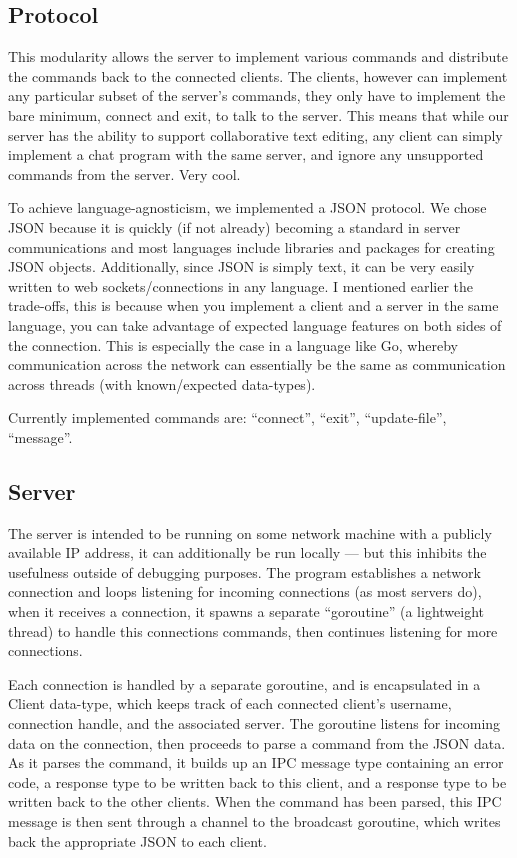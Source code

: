 \documentclass[10pt, letterpaper]{article}
\begin{document}
\subsection*{Protocol}

This modularity allows the server to implement various commands and 
distribute the commands back to the connected clients. The clients, however 
can implement any particular subset of the server's commands, they only have 
to implement the bare minimum, connect and exit, to talk to the server. This 
means that while our server has the ability to support collaborative text 
editing, any client can simply implement a chat program with the same server, 
and ignore any unsupported commands from the server. Very cool.

To achieve language-agnosticism, we implemented a JSON protocol. We chose 
JSON because it is quickly (if not already) becoming a standard in server 
communications and most languages include libraries and packages for creating 
JSON objects. Additionally, since JSON is simply text, it can be very easily 
written to web sockets/connections in any language. I mentioned earlier the 
trade-offs, this is because when you implement a client and a server in the 
same language, you can take advantage of expected language features on both 
sides of the connection. This is especially the case in a language like Go, 
whereby communication across the network can essentially be the same as 
communication across threads (with known/expected data-types).

Currently implemented commands are: ``connect'', ``exit'', ``update-file'', 
``message''.

\subsection*{Server}

The server is intended to be running on some network machine with a publicly 
available IP address, it can additionally be run locally --- but this inhibits 
the usefulness outside of debugging purposes. The program establishes a 
network connection and loops listening for incoming connections (as most 
servers do), when it receives a connection, it spawns a separate ``goroutine'' 
(a lightweight thread) to handle this connections commands, then continues 
listening for more connections.

Each connection is handled by a separate goroutine, and is encapsulated in a 
Client data-type, which keeps track of each connected client's username, 
connection handle, and the associated server. The goroutine listens for 
incoming data on the connection, then proceeds to parse a command from the 
JSON data. As it parses the command, it builds up an IPC message type 
containing an error code, a response type to be written back to this client, 
and a response type to be written back to the other clients. When the command 
has been parsed, this IPC message is then sent through a channel to the 
broadcast goroutine, which writes back the appropriate JSON to each client.
\end{document}
